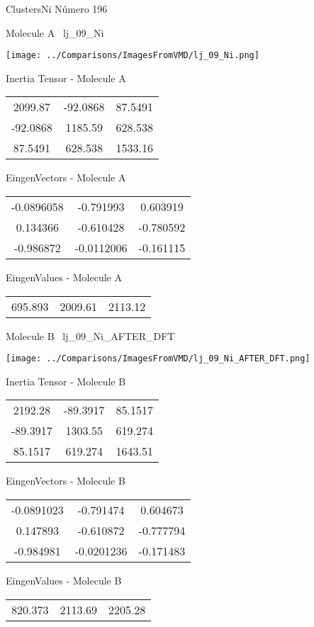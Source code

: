 \vtab[-3cm]
\begin{center}
{\large ClustersNi \tab Número 196}
\end{center}
\begin{multicols}{2}
\begin{center}

Molecule A \
lj\_09\_Ni

\texttt{[image: ../Comparisons/ImagesFromVMD/lj\_09\_Ni.png]}

Inertia Tensor - Molecule A \\
\begin{tabular}{|c c c|}
2099.87	 & 	-92.0868	 & 	87.5491	 \\
-92.0868	 & 	1185.59	 & 	628.538	 \\
87.5491	 & 	628.538	 & 	1533.16
\end{tabular}

\vtab
 EingenVectors - Molecule A     \\
\begin{tabular}{|c c c|}
-0.0896058	 & 	-0.791993	 & 	0.603919	 \\
0.134366	 & 	-0.610428	 & 	-0.780592	 \\
-0.986872	 & 	-0.0112006	 & 	-0.161115
\end{tabular}

\vtab
 EingenValues - Molecule A     \\
\begin{tabular}{|c c c|}
695.893	 & 	2009.61	 & 	2113.12	 \\
\end{tabular}
\columnbreak

Molecule B \
lj\_09\_Ni\_AFTER\_DFT

\texttt{[image: ../Comparisons/ImagesFromVMD/lj\_09\_Ni\_AFTER\_DFT.png]}

Inertia Tensor - Molecule B \\
\begin{tabular}{|c c c|}
2192.28	 & 	-89.3917	 & 	85.1517	 \\
-89.3917	 & 	1303.55	 & 	619.274	 \\
85.1517	 & 	619.274	 & 	1643.51
\end{tabular}

\vtab
 EingenVectors - Molecule B     \\
\begin{tabular}{|c c c|}
-0.0891023	 & 	-0.791474	 & 	0.604673	 \\
0.147893	 & 	-0.610872	 & 	-0.777794	 \\
-0.984981	 & 	-0.0201236	 & 	-0.171483
\end{tabular}

\vtab
 EingenValues - Molecule B     \\
\begin{tabular}{|c c c|}
820.373	 & 	2113.69	 & 	2205.28	 \\
\end{tabular}

\end{center}
\end{multicols}


